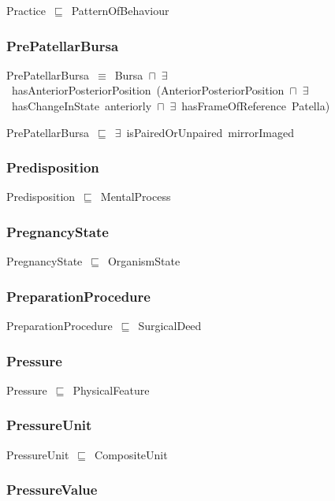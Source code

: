 \documentclass{article}
\begin{document}
Practice~\ensuremath{\sqsubseteq}~PatternOfBehaviour~

\subsubsection*{PrePatellarBursa}

PrePatellarBursa~\ensuremath{\equiv}~Bursa~\ensuremath{\sqcap}~\ensuremath{\exists}~hasAnteriorPosteriorPosition~(AnteriorPosteriorPosition~\ensuremath{\sqcap}~\ensuremath{\exists}~hasChangeInState~anteriorly~\ensuremath{\sqcap}~\ensuremath{\exists}~hasFrameOfReference~Patella)

PrePatellarBursa~\ensuremath{\sqsubseteq}~\ensuremath{\exists}~isPairedOrUnpaired~mirrorImaged~

\subsubsection*{Predisposition}

Predisposition~\ensuremath{\sqsubseteq}~MentalProcess~

\subsubsection*{PregnancyState}

PregnancyState~\ensuremath{\sqsubseteq}~OrganismState~

\subsubsection*{PreparationProcedure}

PreparationProcedure~\ensuremath{\sqsubseteq}~SurgicalDeed~

\subsubsection*{Pressure}

Pressure~\ensuremath{\sqsubseteq}~PhysicalFeature~

\subsubsection*{PressureUnit}

PressureUnit~\ensuremath{\sqsubseteq}~CompositeUnit~

\subsubsection*{PressureValue}
\end{document}
